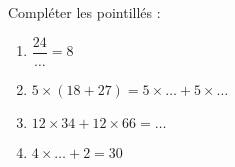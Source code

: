
\begin{exercice}\label{exo2smath-0009}

    Compléter les pointillés :
    \begin{multicols}{3}
        \begin{enumerate}
            \item
                \( \dfrac{ 24 }{ \ldots }=8\)
            \item
                \( 5\times (18+27)=5\times \ldots+5\times \ldots\)
            \item
                \( 12\times 34+12\times 66=\ldots\)
            \item
                \( 4\times \ldots+2=30\)
        \end{enumerate}
    \end{multicols}

\end{exercice}
